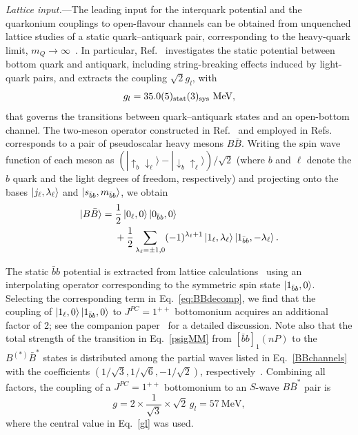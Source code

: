 \documentclass[aps,prl,showpacs,amsmath,twocolumn,superscriptaddress,floatfix,nofootinbib,notitlepage]{revtex4-2}
\newcommand{\bbnP}{[\bar{b}b]_1(nP)}
\newcommand{\be}{\begin{equation}}
\newcommand{\ee}{\end{equation}}
\begin{document}
{\it Lattice input.}---The leading input for the interquark potential and the quarkonium couplings to open-flavour channels can be obtained from unquenched lattice studies of a static quark--antiquark pair, corresponding to the heavy-quark limit, $m_Q\to\infty$~\cite{Bulava:2019iut,Bulava:2024jpj}. In particular, Ref.~\cite{Bulava:2024jpj} investigates the static potential between bottom quark and antiquark, including string-breaking effects induced by light-quark pairs, and extracts the coupling $\sqrt{2}g_l$, with
\be
g_l=35.0(5)_{\rm stat}(3)_{\rm sys}
~\mbox{MeV},
\label{gl}
\ee
that governs the transitions between quark--antiquark states and an open-bottom channel. The two-meson operator constructed in Ref.~\cite{Bali:2005fu} and employed in Refs.~\cite{Bulava:2019iut,Bulava:2024jpj} corresponds to a pair of pseudoscalar heavy mesons $B\bar{B}$. Writing the spin wave function of each meson as $(|{\uparrow_b\downarrow_\ell}\rangle-|{\downarrow_b\uparrow_\ell}\rangle)/\sqrt2$ (where $b$ and $\ell$ denote the $b$ quark and the light degrees of freedom, respectively) and projecting onto the bases $\ket{j_\ell, \lambda_\ell}$ and $\ket{s_{\bar{b}b},m_{\bar{b}b}}$, we obtain
\be
\begin{split}
\ket{B\bar{B}}={}&\frac12\ket{0_\ell,0}\ket{0_{\bar{b}b},0}\\
&+\frac12\sum_{\lambda_\ell=\pm1,0}(-1)^{\lambda_\ell+1}
\ket{1_\ell,\lambda_\ell}\ket{1_{\bar{b}b},-\lambda_\ell}.
\label{eq:BBdecomp}
\end{split}
\ee

The static $\bar{b}b$ potential is extracted from lattice calculations~\cite{Bulava:2019iut, Bulava:2024jpj} using an interpolating operator corresponding to the symmetric spin state $\ket{1_{\bar{b}b},0}$. Selecting the corresponding term in Eq.~\eqref{eq:BBdecomp}, we find that the coupling of $\ket{1_\ell,0}\ket{1_{\bar{b}b},0}$ to $J^{PC}=1^{++}$ bottomonium acquires an additional factor of 2; see the companion paper~\cite{Zhang:2026iyr} for a detailed discussion. Note also that the total strength of the transition in Eq.~\eqref{psigMM} from $\bbnP$ to the $B^{(*)}\bar{B}^*$ states is distributed among the partial waves listed in Eq.~\eqref{BBchannels} with the coefficients $(1/\sqrt{3},1/\sqrt{6},-1/\sqrt{2})$, respectively~\cite{Baru:2016iwj,Bruschini:2023zkb}. Combining all factors, the coupling of a $J^{PC}=1^{++}$ bottomonium to an $S$-wave $B\bar{B}^*$ pair is
\be
g=2\times\frac{1}{\sqrt{3}}\times\sqrt{2}\, g_l= 57~\mbox{MeV},
\label{g}
\ee
where the central value in Eq.~\eqref{gl} was used.
\end{document}
